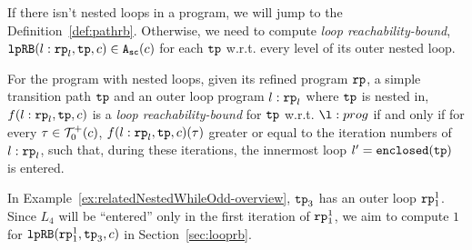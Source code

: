 If there isn't nested loops in a program, we will jump to the Definition~\ref{def:pathrb}.
Otherwise, we need to compute \emph{loop reachability-bound},
$\mathtt{lpRB}(l: \mathtt{rp}_l, \mathtt{tp}, c) \in {\ensuremath{\mathtt{A_{sc}}}}(c)$ for each $\mathtt{tp}$ w.r.t. every level of its outer nested loop.
\begin{defn}
For the program with nested loops, given its refined program $\mathtt{rp}$, a simple transition path $\mathtt{tp}$ and an outer loop
program $l: \mathtt{rp}_l$ where $\mathtt{tp}$ is nested in,
$f(l: \mathtt{rp}_l, \mathtt{tp}, c)$ is a \emph{loop reachability-bound} for $\mathtt{tp}$ w.r.t. $\l:prog$ if and only if
for every $\mathtt{\tau} \in \mathcal{T}^{+}_0(c)$, $f(l: \mathtt{rp}_l, \mathtt{tp}, c)(\mathtt{\tau})$  greater or equal to the
iteration numbers of $l: \mathtt{rp}_l$,
such that,
during these iterations, the innermost loop $l' = \mathtt{enclosed(\mathtt{tp})}$ is entered.
\end{defn}
In Example~\ref{ex:relatedNestedWhileOdd-overview}, $\mathtt{tp}_3$ has an outer loop $\mathtt{rp}_1^1$. Since $L_4$ will be ``entered'' only in the first iteration of $\mathtt{rp}_1^1$,
we aim to compute $1$ for $\mathtt{lpRB}(\mathtt{rp}_1^1, \mathtt{tp}_3, c)$ in Section~\ref{sec:looprb}.


